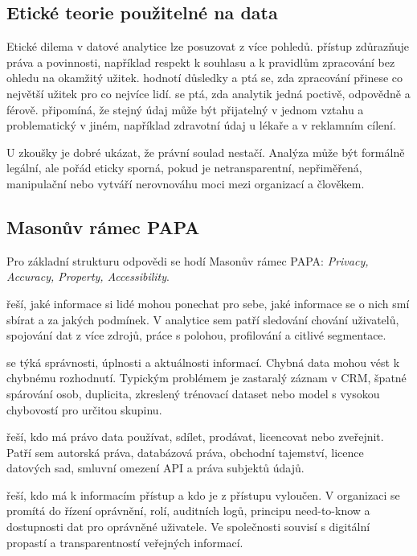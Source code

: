 \subsection{Etické teorie použitelné na data}
Etické dilema v datové analytice lze posuzovat z více pohledů.  přístup zdůrazňuje
práva a povinnosti, například respekt k souhlasu a k pravidlům zpracování bez ohledu na okamžitý
užitek.  hodnotí důsledky a ptá se, zda zpracování přinese co největší užitek
pro co nejvíce lidí.  se ptá, zda analytik jedná poctivě, odpovědně a férově.
 připomíná, že stejný údaj může být přijatelný v jednom vztahu a
problematický v jiném, například zdravotní údaj u lékaře a v reklamním cílení.

U zkoušky je dobré ukázat, že právní soulad nestačí. Analýza může být formálně legální, ale pořád
eticky sporná, pokud je netransparentní, nepřiměřená, manipulační nebo vytváří nerovnováhu moci mezi
organizací a člověkem.

\subsection{Masonův rámec PAPA}
Pro základní strukturu odpovědi se hodí Masonův rámec PAPA: \textit{Privacy, Accuracy, Property,
Accessibility}.

 řeší, jaké informace si lidé mohou ponechat pro sebe, jaké informace se o
nich smí sbírat a za jakých podmínek. V analytice sem patří sledování chování uživatelů, spojování
dat z více zdrojů, práce s polohou, profilování a citlivé segmentace.

 se týká správnosti, úplnosti a aktuálnosti informací. Chybná data mohou
vést k chybnému rozhodnutí. Typickým problémem je zastaralý záznam v CRM, špatné spárování osob,
duplicita, zkreslený trénovací dataset nebo model s vysokou chybovostí pro určitou skupinu.

 řeší, kdo má právo data používat, sdílet, prodávat,
licencovat nebo zveřejnit. Patří sem autorská práva, databázová práva, obchodní tajemství, licence
datových sad, smluvní omezení API a práva subjektů údajů.

 řeší, kdo má k informacím přístup a kdo je z přístupu vyloučen.
V organizaci se promítá do řízení oprávnění, rolí, auditních logů, principu need-to-know a dostupnosti
dat pro oprávněné uživatele. Ve společnosti souvisí s digitální propastí a transparentností veřejných
informací.

